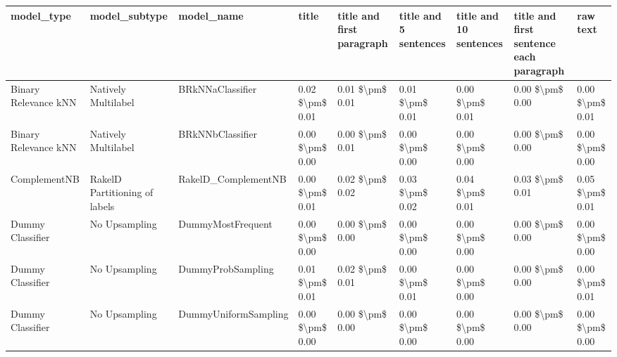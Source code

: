 \begin{tabular}{lllllllll}
\toprule
                     model\_type &                 model\_subtype &                                   model\_name &           title & title and first paragraph & title and 5 sentences & title and 10 sentences & title and first sentence each paragraph &        raw text \\
\midrule
           Binary Relevance kNN &           Natively Multilabel &                             BRkNNaClassifier & 0.02 \$\textbackslash pm\$ 0.01 &           0.01 \$\textbackslash pm\$ 0.01 &       0.01 \$\textbackslash pm\$ 0.01 &        0.00 \$\textbackslash pm\$ 0.01 &                         0.00 \$\textbackslash pm\$ 0.00 & 0.00 \$\textbackslash pm\$ 0.01 \\
           Binary Relevance kNN &           Natively Multilabel &                             BRkNNbClassifier & 0.00 \$\textbackslash pm\$ 0.00 &           0.00 \$\textbackslash pm\$ 0.01 &       0.00 \$\textbackslash pm\$ 0.00 &        0.00 \$\textbackslash pm\$ 0.00 &                         0.00 \$\textbackslash pm\$ 0.00 & 0.00 \$\textbackslash pm\$ 0.00 \\
                   ComplementNB & RakelD Partitioning of labels &                          RakelD\_ComplementNB & 0.00 \$\textbackslash pm\$ 0.01 &           0.02 \$\textbackslash pm\$ 0.02 &       0.03 \$\textbackslash pm\$ 0.02 &        0.04 \$\textbackslash pm\$ 0.01 &                         0.03 \$\textbackslash pm\$ 0.01 & 0.05 \$\textbackslash pm\$ 0.01 \\
               Dummy Classifier &                 No Upsampling &                            DummyMostFrequent & 0.00 \$\textbackslash pm\$ 0.00 &           0.00 \$\textbackslash pm\$ 0.00 &       0.00 \$\textbackslash pm\$ 0.00 &        0.00 \$\textbackslash pm\$ 0.00 &                         0.00 \$\textbackslash pm\$ 0.00 & 0.00 \$\textbackslash pm\$ 0.00 \\
               Dummy Classifier &                 No Upsampling &                            DummyProbSampling & 0.01 \$\textbackslash pm\$ 0.01 &           0.02 \$\textbackslash pm\$ 0.01 &       0.00 \$\textbackslash pm\$ 0.01 &        0.00 \$\textbackslash pm\$ 0.00 &                         0.00 \$\textbackslash pm\$ 0.00 & 0.00 \$\textbackslash pm\$ 0.01 \\
               Dummy Classifier &                 No Upsampling &                         DummyUniformSampling & 0.00 \$\textbackslash pm\$ 0.00 &           0.00 \$\textbackslash pm\$ 0.00 &       0.00 \$\textbackslash pm\$ 0.00 &        0.00 \$\textbackslash pm\$ 0.00 &                         0.00 \$\textbackslash pm\$ 0.00 & 0.00 \$\textbackslash pm\$ 0.00 \\

\end{tabular}
